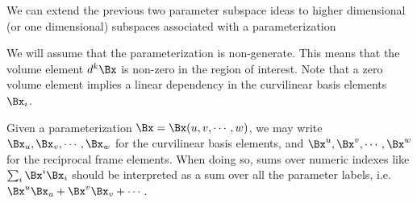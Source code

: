 %
%

We can extend the previous two parameter subspace ideas to higher dimensional (or one dimensional) subspaces associated with a parameterization


We will assume that the parameterization is non-generate.
This means that the
volume element \( d^k \Bx \) is non-zero in the region of interest.
Note that a zero volume element implies a linear dependency in the curvilinear basis elements \( \Bx_i \).

Given a parameterization \( \Bx = \Bx(u,v,\cdots, w) \), we may write
\( \Bx_u, \Bx_v, \cdots, \Bx_w \) for the curvilinear basis elements, and
\( \Bx^u, \Bx^v, \cdots, \Bx^w \) for the reciprocal frame elements.
When doing so, sums over numeric indexes like \( \sum_i \Bx^i \Bx_i \) should be interpreted as a sum over all the parameter labels, i.e. \( \Bx^u \Bx_u + \Bx^v \Bx_v + \cdots \).

